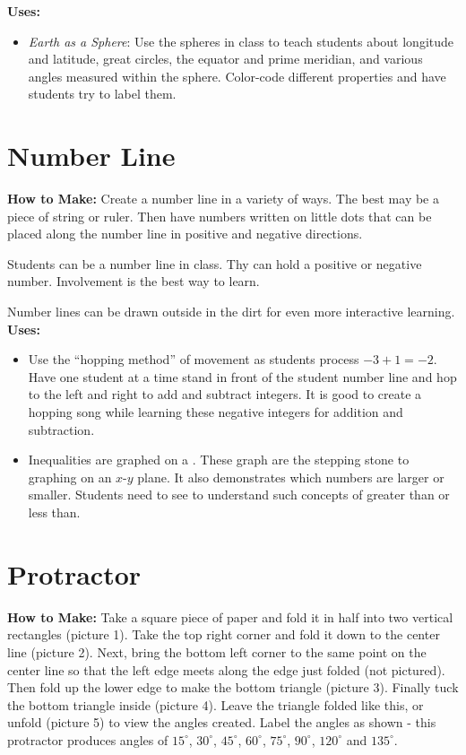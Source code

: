 \noindent\textbf{Uses:}
\begin{itemize}
\item \emph{Earth as a Sphere}: Use the spheres in class to teach students about longitude and latitude, great circles, the equator and prime meridian, and various angles measured within the sphere. Color-code different properties and have students try to label them.
\end{itemize}

\section{Number Line} \label{numberline}
\textbf{How to Make:} Create a number line in a variety of ways. The best may be a piece of string or ruler. Then have numbers written on little dots that can be placed along the number line in positive and negative directions.

Students can be a number line in class. Thy can hold a positive or negative number. Involvement is the best way to learn. 

Number lines can be drawn outside in the dirt for even more interactive learning.\\

\noindent\textbf{Uses:}
\begin{itemize}
\item Use the ``hopping method'' of movement as students process $-3 + 1 = -2$. Have one student at a time stand in front of the student number line and hop to the left and right to add and subtract integers. It is good to create a hopping song while learning these negative integers for addition and subtraction. 
\item Inequalities are graphed on a . These graph are the stepping stone to graphing on an $x$-$y$ plane. It also demonstrates which numbers are larger or smaller. Students need to see to understand such concepts of greater than or less than.
\end{itemize}

\section{Protractor} \label{protractor}
\textbf{How to Make:} Take a square piece of paper and fold it in half into two vertical rectangles (picture 1). Take the top right corner and fold it down to the center line (picture 2). Next, bring the bottom left corner to the same point on the center line so that the left edge meets along the edge just folded (not pictured). Then fold up the lower edge to make the bottom triangle (picture 3). Finally tuck the bottom triangle inside (picture 4). Leave the triangle folded like this, or unfold (picture 5) to view the angles created. Label the angles as shown - this protractor produces angles of $15^\circ$, $30^\circ$, $45^\circ$, $60^\circ$, $75^\circ$, $90^\circ$, $120^\circ$ and $135^\circ$.

